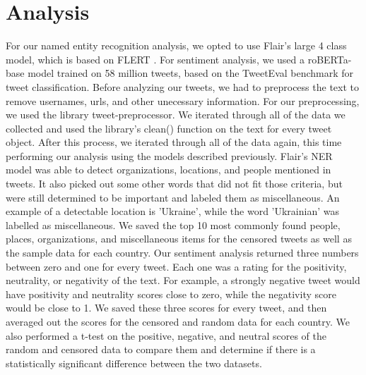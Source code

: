 \section{Analysis}\label{sec:analysis}
For our named entity recognition analysis, we opted to use Flair's large 4 class model, which is based on FLERT \cite{schweter2020flert}. 
For sentiment analysis, we used a roBERTa-base model trained on 58 million tweets, based on the TweetEval benchmark \cite{DBLP:journals/corr/abs-2010-12421} for tweet classification.
Before analyzing our tweets, we had to preprocess the text to remove usernames, urls, and other unecessary information. For our preprocessing, we used the library tweet-preprocessor. We iterated through all of the data we collected 
and used the library's clean() function on the text for every tweet object. After this process, we iterated through all of the data again, this time performing our analysis using the models
described previously. Flair's NER model was able to detect organizations, locations, and people mentioned in tweets. It also picked out some other words that did not fit those criteria, but were still
determined to be important and labeled them as miscellaneous. An example of a detectable location is 'Ukraine', while the word 'Ukrainian' was labelled as miscellaneous. We saved the top 10 most commonly found 
people, places, organizations, and miscellaneous items for the censored tweets as well as the sample data for each country. Our sentiment analysis returned three numbers between zero and one for every tweet. Each one was a rating
for the positivity, neutrality, or negativity of the text. For example, a strongly negative tweet would have positivity and neutrality scores close to zero, while the negativity score would be close to 1. We saved these three scores for every tweet,
and then averaged out the scores for the censored and random data for each country. We also performed a t-test on the positive, negative, and neutral scores of the random and censored data to compare them and determine if there is a statistically significant
difference between the two datasets.